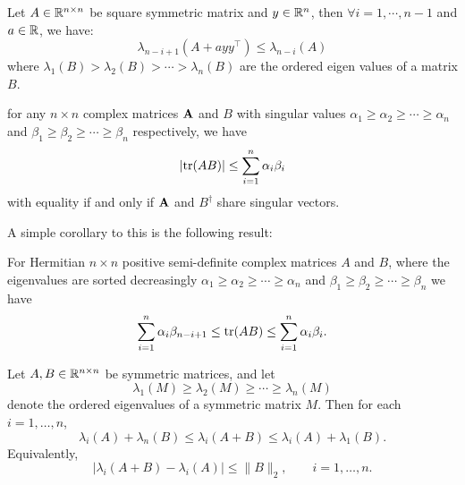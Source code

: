 \documentclass[numsec,webpdf,modern,medium,namedate]{oup-authoring-template}
\theoremstyle{thmstyleone}%
\theoremstyle{thmstyletwo}%
\theoremstyle{thmstylethree}%
\begin{document}
\begin{lemma}\label{lem:interlacing-lemma}
Let $A \in \mathbb{R}^{n \times n}$ be square symmetric matrix and $y \in \mathbb{R}^n$, then $\forall i = 1,\cdots, n-1$ and $a \in \mathbb{R}$, we have:
\begin{equation}\label{eq:interlacing}
    \lambda_{n-i+1}(A +ayy^\top) \leq \lambda_{n-i}(A)
\end{equation}
where $\lambda_1(B) > \lambda_2(B) > \cdots > \lambda_{n}(B)$ are the ordered eigen values of a matrix $B$.
\end{lemma}

\begin{lemma}\label{lem:von-neuman}
 for any $n \times n$ complex matrices $\mathbf{A}$ and $B$ with singular values
$\alpha_1 \geq \alpha_2 \geq \cdots \geq \alpha_n$ and $\beta_1 \geq \beta_2 \geq \cdots \geq \beta_n$ respectively, we have
\begin{equation*}
 |\mathrm{tr}(AB)| \leq \sum_{i=1}^{n} \alpha_i \beta_i
\end{equation*}
with equality if and only if $\mathbf{A}$ and $B^{\dagger}$ share singular vectors.
\end{lemma}
A simple corollary to this is the following result: 

\begin{lemma}
For Hermitian $n \times n$ positive semi-definite complex matrices 
$A$ and $B$, where the eigenvalues are sorted decreasingly
$
\alpha_1 \geq \alpha_2 \geq \cdots \geq \alpha_n$  and $\beta_1 \geq \beta_2 \geq \cdots \geq \beta_n$
we have
\begin{equation}\label{eq:trAB-lb}
    \sum_{i=1}^{n} \alpha_i \beta_{n - i + 1} \leq \mathrm{tr}(AB) \leq \sum_{i=1}^{n} \alpha_i \beta_i.   
\end{equation}
\end{lemma}

\begin{lemma}\label{lem:weyl-ineq}
Let $A,B \in \mathbb{R}^{n\times n}$ be symmetric matrices, and let
\begin{equation*}
\lambda_1(M) \ge \lambda_2(M) \ge \cdots \ge \lambda_n(M)
\end{equation*}
denote the ordered eigenvalues of a symmetric matrix $M$. Then for each $i=1,\dots,n$,
\begin{equation*}
\lambda_i(A) + \lambda_n(B) \leq 
\lambda_i(A+B) \leq
\lambda_i(A) + \lambda_1(B).
\end{equation*}
Equivalently,
\begin{equation*}
\left| \lambda_i(A+B)-\lambda_i(A) \right|
\le
\|B\|_2,
\qquad i=1,\dots,n.
\end{equation*}
\end{lemma}
\end{document}
